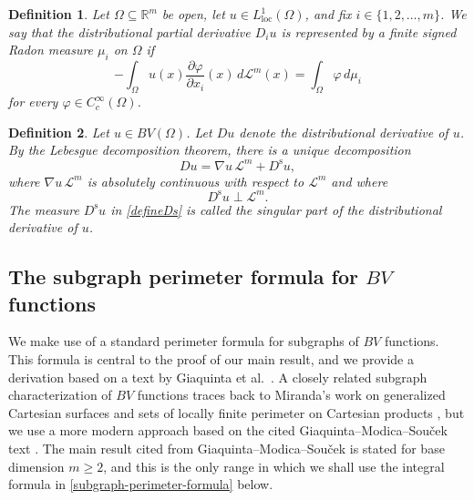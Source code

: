 \documentclass{publicadapt}
\newtheorem{definition}{Definition}
\begin{document}
\begin{definition}
 Let $ \Omega \subseteq \mathbb R^m$ be open, let \(u\in L^1_{\mathrm{loc}}(\Omega)\), and fix \(i\in\{1, 2, \ldots,m\}\). We say that the distributional partial derivative \(D_i u\) 
 is \emph{represented} by a finite signed Radon measure \(\mu_i\)
on \(\Omega\) if
\[
-\int_\Omega u(x)\frac{\partial \varphi}{\partial x_i}(x)\,d\mathcal L^m(x)
=
\int_\Omega \varphi\,d\mu_i
\]
for every \(\varphi\in C_c^\infty(\Omega)\). 
\end{definition}

\begin{definition} 
 Let $u\in BV(\Omega)$. Let $Du$ denote the distributional derivative of $u$. By the Lebesgue decomposition
 theorem, there is a unique decomposition
\begin{equation}\label{defineDs}
Du=\nabla u\,\mathcal L^m+D^{\operatorname{s}} u,
\end{equation}
where $\nabla u\,\mathcal L^m$ is absolutely continuous with respect to
$\mathcal L^m$ and where 
\begin{equation}\label{DsuperpLm} 
 D^{\operatorname{s}} u\perp\mathcal L^m. 
\end{equation}
 The measure $D^{\operatorname{s}} u$ in \eqref{defineDs} is called
 the \emph{singular part of the distributional derivative of $u$}. 
\end{definition}

\subsection{The subgraph perimeter formula for \(BV\) functions}\label{subsec:subgraph-perimeter-formula}
 We make use of a standard perimeter formula for subgraphs of \(BV\) functions.
 This formula is central to the proof of our main result, and we provide a derivation based 
 on a text by Giaquinta et al.\ \cite[\S4.1.5]{GiaquintaModicaSoucek1998}.
 A closely related subgraph characterization of \(BV\) functions traces back 
 to Miranda's work on generalized Cartesian surfaces and sets of locally finite perimeter on Cartesian products \cite{Miranda1964}, 
 but we use a more modern approach based on the cited Giaquinta--Modica--Sou\v{c}ek text
 \cite[\S4.1.5]{GiaquintaModicaSoucek1998}. 
 The main result cited from Giaquinta--Modica--Sou\v{c}ek is stated for base
 dimension \(m\ge2\), and this is the only range in which we shall use the integral formula in \eqref{subgraph-perimeter-formula} below. 
\end{document}
